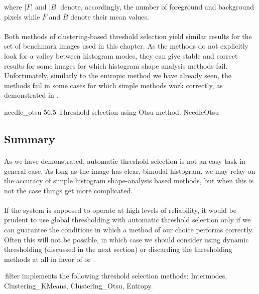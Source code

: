 where $|F|$ and $|B|$ denote, accordingly, the number of foreground and background pixels while $\overline{F}$ and $\overline{B}$ denote their mean values.

\paragraph*{}
Both methods of clustering-based threshold selection yield similar results for the set of benchmark images used in this chapter. As the methods do not explicitly look for a valley between histogram modes, they can give stable and correct results for some images for which histogram shape analysis methods fail. Unfortunately, similarly to the entropic method we have already seen, the methods fail in some cases for which simple methods work correctly, as demonstrated in .

\thresholdFigure
{needle_otsu}
{56.5}
{Threshold selection using Otsu method.}
{NeedleOtsu}

\subsection{Summary}

\paragraph*{}
As we have demonstrated, automatic threshold selection is not an easy task in general case. As long as the image has clear, bimodal histogram, we may relay on the accuracy of simple histogram shape-analysis based methods, but when this is not the case things get more complicated. 

\paragraph*{}
If the system is supposed to operate at high levels of reliability, it would be prudent to use global thresholding with automatic threshold selection only if we can guarantee the conditions in which a method of our choice performs correctly. Often this will not be possible, in which case we should consider using dynamic thresholding (discussed in the next section) or discarding the thresholding methods at all in favor of  or .

\begin{refImpl}
\studio \,filter  implements the following threshold selection methods: Intermodes, Clustering\_KMeans, Clustering\_Otsu, Entropy. 
\end{refImpl}
